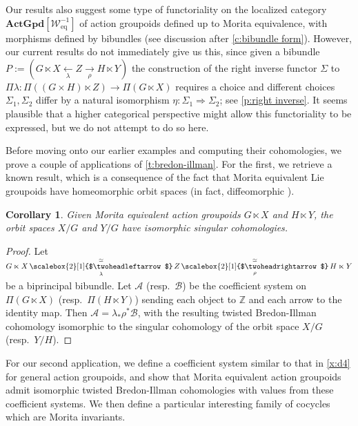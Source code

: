 \documentclass[12pt,reqno]{amsart}
\newcommand{\printname}[1]{}
\renewcommand{\printname}[1]
	{{\color{brown}{\makebox[0pt]{\hspace{-1in}\raisebox{8pt}{\tiny #1}}}}}
\newcommand{\labell}[1]{\label{#1} \printname{#1}}
\newcommand{\calA}{{\mathcal{A}}}
\newcommand{\calB}{{\mathcal{B}}}
\newcommand{\calW}{{\mathcal{W}}}
\newcommand{\ZZ}{{\mathbb{Z}}}  %
\newcommand{\ot}[1]{{\,\underset{\raisebox{1mm}{$\scriptstyle{#1}$}}{\overset{\simeq}{\scalebox{2}[1]{$\twoheadleftarrow$}}}\,}} %
\newcommand{\subdwe}{{\,\overset{\simeq}{\scalebox{2}[1]{$\twoheadrightarrow$}}\,}} %
\theoremstyle{plain}
\newtheorem{corollary}[theorem]{Corollary}
\theoremstyle{definition}
\newcommand{\ActGpd}{{\mathbf{ActGpd}}} %
\newcommand{\eq}{{\operatorname{eq}}} %
\begin{document}
    Our results also suggest some type of functoriality on the localized category $\ActGpd[\calW_\eq^{-1}]$ of action groupoids defined up to Morita equivalence, with  morphisms defined by bibundles (see discussion after \cref{c:bibundle form}).    However, our current results do not immediately give us this, since given a bibundle $P:=\left(G\ltimes X\underset{\lambda}{\longleftarrow}Z\underset{\rho}{\longrightarrow}H\ltimes Y\right)$ the construction of the right inverse functor 
    $\Sigma$ to $\Pi\lambda\colon\Pi((G\times H)\ltimes Z)\to\Pi(G\ltimes X)$ requires a choice  and different choices $\Sigma_1,\Sigma_2$ differ by a natural isomorphism $\eta\colon\Sigma_1\Rightarrow\Sigma_2$; see \cref{p:right inverse}.   It seems plausible that a higher categorical perspective might allow this functoriality to be expressed, but we do not attempt to do so here.

    Before moving onto our earlier examples and computing their cohomologies, we prove a couple of applications of \cref{t:bredon-illman}.  For the first, we retrieve a known result, which is a consequence of the fact that Morita equivalent Lie groupoids have homeomorphic orbit spaces \cite[Theorem 4.3.1]{dH:orbispaces} (in fact, diffeomorphic \cite[Theorem 3.8]{watts:lgpd-derham}).

    \begin{corollary}\labell{c:cohom orbit sp}
        Given Morita equivalent action groupoids $G\ltimes X$ and $H\ltimes Y$, the orbit spaces $X/G$ and $Y/G$ have isomorphic singular cohomologies.
    \end{corollary}

    \begin{proof}
        Let $G\ltimes X\ot{\lambda}Z\underset{\raisebox{1mm}{$\scriptstyle\rho$}}{\subdwe} H\ltimes Y$ be a biprincipal bibundle.  Let $\calA$ (resp.\ $\calB$) be the coefficient system on $\Pi(G\ltimes X)$ (resp.\ $\Pi(H\ltimes Y)$) sending each object to $\ZZ$ and each arrow to the identity map.  Then $\calA=\lambda_*\rho^*\calB$, with the resulting twisted Bredon-Illman cohomology isomorphic to the singular cohomology of the orbit space $X/G$ (resp.\ $Y/H$).
    \end{proof}

    For our second application, we define a coefficient system similar to that in \cref{x:d4} for general action groupoids, and show that Morita equivalent action groupoids admit isomorphic twisted Bredon-Illman cohomologies with values from these coefficient systems.  We then define a particular interesting family of cocycles which are Morita invariants.
\end{document}
